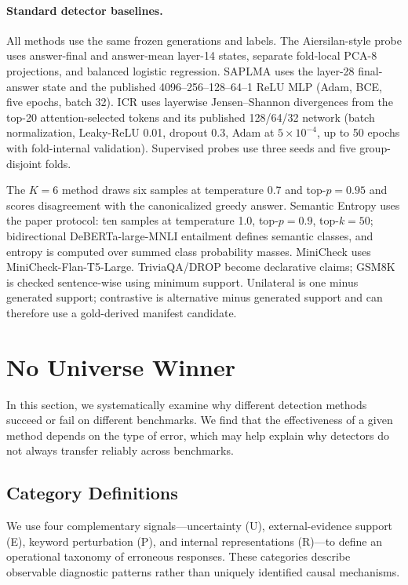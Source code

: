 \paragraph{Standard detector baselines.}
All methods use the same frozen generations and labels. The Aiersilan-style
probe uses answer-final and answer-mean layer-14 states, separate fold-local
PCA-8 projections, and balanced logistic regression. SAPLMA uses the layer-28
final-answer state and the published 4096--256--128--64--1 ReLU MLP (Adam, BCE,
five epochs, batch 32). ICR uses layerwise Jensen--Shannon divergences from the
top-20 attention-selected tokens and its published 128/64/32 network (batch
normalization, Leaky-ReLU 0.01, dropout 0.3, Adam at $5\times10^{-4}$, up to
50 epochs with fold-internal validation). Supervised probes use three seeds and
five group-disjoint folds.

The $K=6$ method draws six samples at temperature 0.7 and top-$p=0.95$ and
scores disagreement with the canonicalized greedy answer. Semantic Entropy
uses the paper protocol: ten samples at temperature 1.0, top-$p=0.9$, top-$k=50$;
bidirectional DeBERTa-large-MNLI entailment defines semantic classes, and
entropy is computed over summed class probability masses. MiniCheck uses
MiniCheck-Flan-T5-Large. TriviaQA/DROP become declarative claims; GSM8K is
checked sentence-wise using minimum support. Unilateral is one minus generated
support; contrastive is alternative minus generated support and can therefore
use a gold-derived manifest candidate.
\fi

\section{No Universe Winner}
\label{sec:category}
In this section, we systematically examine why different detection methods succeed or fail on different benchmarks.  We find that the effectiveness of a given method depends on the type of error, which may help explain why detectors do not always transfer reliably across benchmarks. 

\subsection{Category Definitions}
We use four complementary signals---uncertainty (U), external-evidence support (E), keyword perturbation (P), and internal representations (R)---to define an operational taxonomy of erroneous responses.  These categories describe observable diagnostic patterns rather than uniquely identified causal mechanisms.

